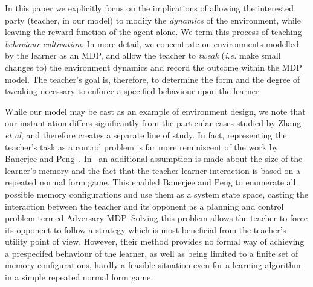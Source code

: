 In this paper we explicitly focus on the implications of allowing the
interested party (teacher, in our model) to modify the \emph{dynamics}
of the environment, while leaving the reward function of the agent
alone. We term this process of teaching {\em behaviour
  cultivation}. In more detail, we concentrate on environments
modelled by the learner as an MDP, and allow the teacher to
\emph{tweak} (\emph{i.e.} make small changes to) the environment
dynamics and record the outcome within the MDP model.  The teacher's
goal is, therefore, to determine the form and the degree of tweaking
necessary to enforce a specified behaviour upon the learner.


While our model may be cast as an example of environment design, we
note that our instantiation differs significantly from the particular
cases studied by Zhang \emph{et al}, and therefore creates a separate
line of study. In fact, representing the teacher's task as a control
problem is far more reminiscent of the work by Banerjee and
Peng~\cite{banerjee_peng_2005}. In~\cite{banerjee_peng_2005} an
additional assumption is made about the size of the learner's memory
and the fact that the teacher-learner interaction is based on a
repeated normal form game. This enabled Banerjee and Peng to enumerate
all possible memory configurations and use them as a system state
space, casting the interaction between the teacher and its opponent as
a planning and control problem termed Adversary MDP. Solving this
problem allows the teacher to force its opponent to follow a strategy
which is most beneficial from the teacher's utility point of
view. However, their method provides no formal way of achieving a
prespecifed behaviour of the learner, as well as being limited to a
finite set of memory configurations, hardly a feasible situation even
for a learning algorithm in a simple repeated normal form game.

